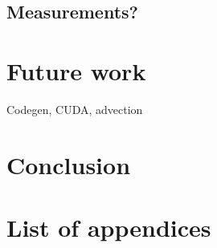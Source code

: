 \documentclass[fontsize=11pt, appendixprefix=true]{scrreprt}
\begin{document}

\section{Measurements?}

\chapter{Future work}

Codegen, CUDA, advection

\chapter{Conclusion}

\printbibliography
\appendix
\chapter{List of appendices}
\end{document}
